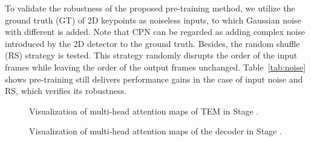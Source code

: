 \documentclass[]{llncs}
\newcommand{\RNum}[1]{\uppercase\expandafter{\romannumeral #1\relax}}
\begin{document}
To validate the robustness of the proposed pre-training method, we utilize the ground truth (GT) of 2D keypoints as noiseless inputs, to which Gaussian noise with different  is added. Note that CPN can be regarded as adding complex noise introduced by the 2D detector to the ground truth. Besides, the random shuffle (RS) strategy is tested. This strategy randomly disrupts the order of the input frames while leaving the order of the output frames unchanged. Table~\ref{tab:noise} shows pre-training still delivers performance gains in the case of input noise and RS, which verifies its robustness. 

\clearpage


\begin{figure}[t]
\centering
{}
\vspace{-0.2cm}
\caption{Visualization of multi-head attention maps of TEM in Stage \RNum{1}.}
\vspace{-0.2cm}
\label{fig:stage1_enc}
\end{figure}

\begin{figure}[t]
\centering
{}
\vspace{-0.2cm}
\caption{Visualization of multi-head attention maps of the decoder in Stage \RNum{1}. }
\vspace{-0.2cm}
\label{fig:stage1_dec}
\end{figure}
\end{document}
